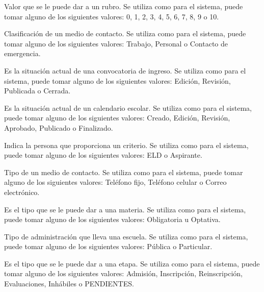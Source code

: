 \begin{description}
	 Valor que se le puede dar a un rubro. Se utiliza como  para el sistema, puede tomar alguno de los siguientes valores: 0, 1, 2, 3, 4, 5, 6, 7, 8, 9 o 10.
	
	 Clasificación de un medio de contacto. Se utiliza como  para el sistema, puede tomar alguno de los siguientes valores: Trabajo, Personal o Contacto de emergencia.

	 Es la situación actual de una convocatoria de ingreso. Se utiliza como  para el sistema, puede tomar alguno de los siguientes valores: Edición, Revisión, Publicada o Cerrada.

	 Es la situación actual de un calendario escolar. Se utiliza como  para el sistema, puede tomar alguno de los siguientes valores: Creado, Edición, Revisión, Aprobado, Publicado o Finalizado.

	 Indica la persona que proporciona un criterio. Se utiliza como  para el sistema, puede tomar alguno de los siguientes valores: ELD o Aspirante.
	
	 Tipo de un medio de contacto. Se utiliza como  para el sistema, puede tomar alguno de los siguientes valores: Teléfono fijo, Teléfono celular o Correo electrónico.

	 Es el tipo que se le puede dar a una materia. Se utiliza como  para el sistema, puede tomar alguno de los siguientes valores: Obligatoria u Optativa.

	 Tipo de administración que lleva una escuela. Se utiliza como  para el sistema, puede tomar alguno de los siguientes valores: Pública o Particular.

	 Es el tipo que se le puede dar a una etapa. Se utiliza como  para el sistema, puede tomar alguno de los siguientes valores: Admisión, Inscripción, Reinscripción, Evaluaciones, Inhábiles o PENDIENTES.
	

\end{description}
